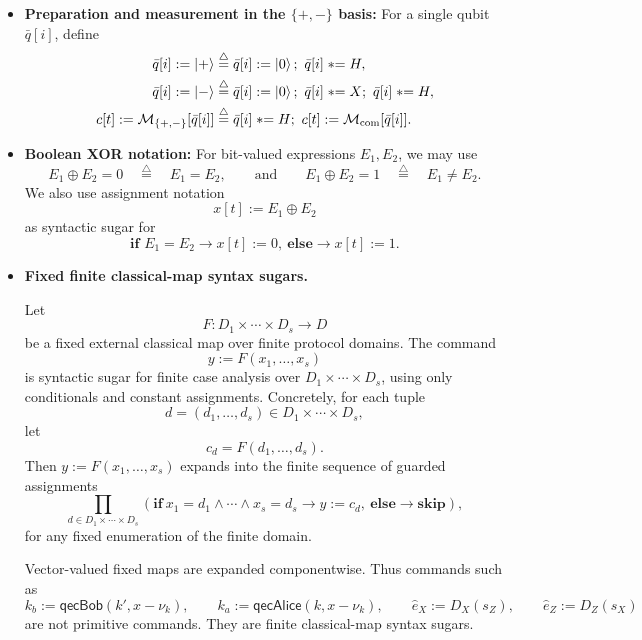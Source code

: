\documentclass[acmsmall,screen,review,anonymous,nonacm]{acmart}
\theoremstyle{defn_style}
\newcommand{\asteq}{\mathrel{*}=}
\begin{document}
\begin{itemize}
    \item \textbf{Preparation and measurement in the \(\{+,-\}\) basis:}
    For a single qubit \(\bar q[i]\), define
    \begin{align*}
        \bar q[i] := \ket{+}
        &\stackrel{\triangle}{=}
        \bar q[i] := \ket{0};\ \bar q[i]\asteq H,\\
        \bar q[i] := \ket{-}
        &\stackrel{\triangle}{=}
        \bar q[i] := \ket{0};\ \bar q[i]\asteq X;\ \bar q[i]\asteq H,\\
        c[t] := \mathcal M_{\{+,-\}}[\bar q[i]]
        &\stackrel{\triangle}{=}
        \bar q[i]\asteq H;\ c[t]:=\mathcal M_{\mathrm{com}}[\bar q[i]].
    \end{align*}

    \item \textbf{Boolean XOR notation:}
    For bit-valued expressions \(E_1,E_2\), we may use
    \[
    E_1\oplus E_2=0
    \quad\stackrel{\triangle}{=}\quad
    E_1=E_2,
    \qquad\text{and}\qquad
    E_1\oplus E_2=1
    \quad\stackrel{\triangle}{=}\quad
    E_1\neq E_2.
    \]
    We also use assignment notation
    \[
    x[t] := E_1\oplus E_2
    \]
    as syntactic sugar for
    \[
    \textbf{if } E_1=E_2 \rightarrow x[t]:=0,
    \ \textbf{else}\rightarrow x[t]:=1.
    \]

    \item \textbf{Fixed finite classical-map syntax sugars.}

    Let
    \[
    F:D_1\times\cdots\times D_s\to D
    \]
    be a fixed external classical map over finite protocol domains. The command
    \[
    y:=F(x_1,\ldots,x_s)
    \]
    is syntactic sugar for finite case analysis over
    \(D_1\times\cdots\times D_s\), using only conditionals and constant
    assignments. Concretely, for each tuple
    \[
    d=(d_1,\ldots,d_s)\in D_1\times\cdots\times D_s,
    \]
    let
    \[
    c_d=F(d_1,\ldots,d_s).
    \]
    Then \(y:=F(x_1,\ldots,x_s)\) expands into the finite sequence of guarded
    assignments
    \[
    \prod_{d\in D_1\times\cdots\times D_s}
    \left(
    \mathbf{if}\ x_1=d_1\land\cdots\land x_s=d_s
    \rightarrow y:=c_d,
    \ \mathbf{else}\rightarrow\mathbf{skip}
    \right),
    \]
    for any fixed enumeration of the finite domain.

    Vector-valued fixed maps are expanded componentwise. Thus commands such as
    \[
    k_b:=\mathsf{qecBob}(k',x-\nu_k),
    \qquad
    k_a:=\mathsf{qecAlice}(k,x-\nu_k),
    \qquad
    \hat e_X:=D_X(s_Z),
    \qquad
    \hat e_Z:=D_Z(s_X)
    \]
    are not primitive commands. They are finite
    classical-map syntax sugars.


\end{itemize}
\end{document}
